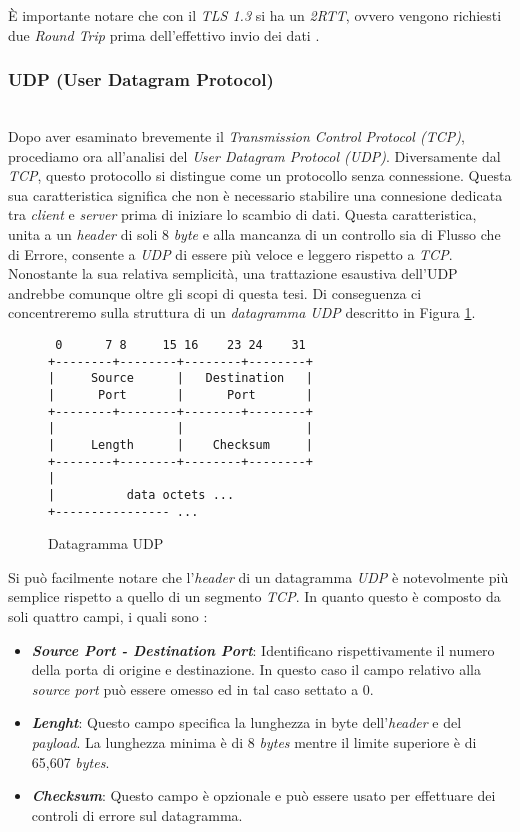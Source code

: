 \noindent È importante notare che con il \emph{TLS 1.3} si ha un \emph{2RTT}, ovvero vengono richiesti due \emph{Round Trip} prima dell'effettivo invio dei dati \cite{site:tls}. 
\subsubsection{UDP (User Datagram Protocol)}
~\\
\indent Dopo aver esaminato brevemente il \emph{Transmission Control Protocol (TCP)},
procediamo ora all'analisi del \emph{User Datagram Protocol (UDP)}. 
Diversamente dal \emph{TCP}, questo protocollo si distingue come un protocollo senza connessione. 
Questa sua caratteristica significa che non è necessario stabilire una connesione dedicata tra \emph{client} e \emph{server} prima di iniziare lo scambio di dati. 
Questa caratteristica, unita a un \emph{header} di soli 8 \emph{byte} e alla mancanza di un controllo sia di Flusso che di Errore, consente a \emph{UDP} di essere più veloce e leggero rispetto a \emph{TCP}.
\\
Nonostante la sua relativa semplicità, una trattazione esaustiva dell'UDP andrebbe comunque oltre gli scopi di questa tesi. 
Di conseguenza ci concentreremo sulla struttura di un \emph{datagramma {UDP}} descritto in Figura \ref{udp-datagram}.
\\
\begin{figure}[!h]
    \centering
    \begin{BVerbatim}
 0      7 8     15 16    23 24    31
+--------+--------+--------+--------+
|     Source      |   Destination   |
|      Port       |      Port       |
+--------+--------+--------+--------+
|                 |                 |
|     Length      |    Checksum     |
+--------+--------+--------+--------+
|
|          data octets ...
+---------------- ...
        \end{BVerbatim}
    \caption{Datagramma UDP}
    \label{udp-datagram}
\end{figure}

\noindent Si può facilmente notare che l'\emph{header} di un datagramma \emph{UDP} è notevolmente più semplice rispetto a quello di un segmento \emph{TCP}.
In quanto questo è composto da soli quattro campi, i quali sono :  
\begin{itemize}
    \item \textit{\textbf{Source Port - Destination Port}}: Identificano rispettivamente il numero della porta di origine e destinazione. In questo caso il campo relativo alla \emph{source port} può essere omesso ed in tal caso settato a 0.
    \item \textit{\textbf{Lenght}}: Questo campo specifica la lunghezza in byte dell'\emph{header} e del \emph{payload}. La lunghezza minima è di 8 \emph{bytes} mentre il limite superiore è di 65,607 \emph{bytes}.
    \item \textit{\textbf{Checksum}}: Questo campo è opzionale e può essere usato per effettuare dei controli di errore sul datagramma.
\end{itemize}

